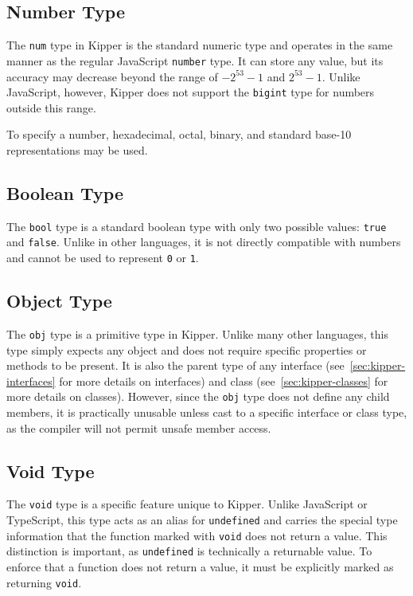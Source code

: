 \subsection{Number Type}

The \lstinline|num| type in Kipper is the standard numeric type and operates in the same manner as the regular JavaScript \lstinline|number| type. It can store any value, but its accuracy may decrease beyond the range of \(-2^{53} - 1\) and \(2^{53} - 1\). Unlike JavaScript, however, Kipper does not support the \lstinline|bigint| type for numbers outside this range.

To specify a number, hexadecimal, octal, binary, and standard base-10 representations may be used.

\subsection{Boolean Type}

The \lstinline|bool| type is a standard boolean type with only two possible values: \lstinline|true| and \lstinline|false|. Unlike in other languages, it is not directly compatible with numbers and cannot be used to represent \lstinline|0| or \lstinline|1|.

\subsection{Object Type}

The \lstinline|obj| type is a primitive type in Kipper. Unlike many other languages, this type simply expects any object and does not require specific properties or methods to be present. It is also the parent type of any interface (see~\ref{sec:kipper-interfaces} for more details on interfaces) and class (see~\ref{sec:kipper-classes} for more details on classes). However, since the \lstinline|obj| type does not define any child members, it is practically unusable unless cast to a specific interface or class type, as the compiler will not permit unsafe member access.

\subsection{Void Type}

The \lstinline|void| type is a specific feature unique to Kipper. Unlike JavaScript or TypeScript, this type acts as an alias for \lstinline|undefined| and carries the special type information that the function marked with \lstinline|void| does not return a value. This distinction is important, as \lstinline|undefined| is technically a returnable value. To enforce that a function does not return a value, it must be explicitly marked as returning \lstinline|void|.

